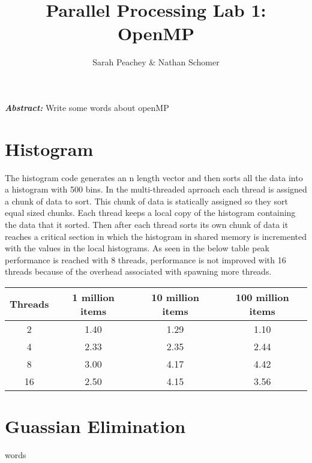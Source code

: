 \documentclass[12pt]{article}
\begin{document}
\title{Parallel Processing Lab 1: OpenMP}
\author{Sarah Peachey \& Nathan Schomer}
\maketitle

\textbf{\textit{Abstract:}} Write some words about openMP

\newpage

\tableofcontents

\newpage


\section{Histogram\label{histo}}
\qquad The histogram code generates an n length vector and then sorts all
the data into a histogram with 500 bins. In the multi-threaded aprroach each
thread is assigned a chunk of data to sort. This chunk of data is statically
assigned so they sort equal sized chunks. Each thread keeps a local copy of
the histogram containing the data that it sorted. Then after each thread
sorts its own chunk of data it reaches a critical section in which the
histogram in shared memory is incremented with the values in the local
histograms. As seen in the below table peak performance is reached with 8
threads, performance is not improved with 16 threads because of the overhead
associated with spawning more threads. 

\begin{center}
\hspace*{-2.5cm}
\begin{tabular}{@{}|c|c|c|c|}
\hline
Threads & 1 million items & 10 million items & 100 million items \\
\hline 
2 & 1.40 & 1.29 & 1.10 \\
\hline
4 & 2.33 & 2.35 & 2.44 \\
\hline
8 & 3.00 & 4.17 & 4.42 \\
\hline 
16 & 2.50 & 4.15 & 3.56 \\
\hline 
\end{tabular}
\hspace*{-2.5cm}
\end{center}


\section{Guassian Elimination\label{guass}}
\qquad words 
\end{document}
